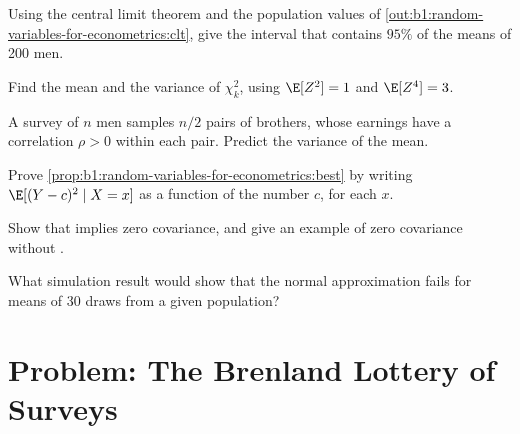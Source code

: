 \begin{exercise}[$\star\star$]\label{exo:b1:random-variables-for-econometrics:interval}
Using the central limit theorem and the population values of
\cref{out:b1:random-variables-for-econometrics:clt}, give the interval that contains $95\%$ of
the means of 200 men.
\end{exercise}

\begin{exercise}[$\star\star$]\label{exo:b1:random-variables-for-econometrics:chi2}
Find the mean and the variance of $\chi^2_k$, using $\E[Z^2] = 1$ and $\E[Z^4] = 3$.
\end{exercise}

\begin{exercise}[$\star\star$]\label{exo:b1:random-variables-for-econometrics:brothers}
A survey of $n$ men samples $n/2$ pairs of brothers, whose earnings have a
correlation $\rho > 0$ within each pair. Predict the variance of the mean.
\end{exercise}

\begin{exercise}[$\star\star\star$]\label{exo:b1:random-variables-for-econometrics:best}
Prove \cref{prop:b1:random-variables-for-econometrics:best} by writing $\E[(Y - c)^2 \mid X = x]$ as a
function of the number $c$, for each $x$.
\end{exercise}

\begin{exercise}[$\star\star\star$]\label{exo:b1:random-variables-for-econometrics:mean-indep}
Show that  implies zero covariance, and give an example
of zero covariance without .
\end{exercise}

\begin{exercise}[$\star\star\star$]\label{exo:b1:random-variables-for-econometrics:fail}
What simulation result would show that the normal approximation fails for
means of 30 draws from a given population?
\end{exercise}

\section{Problem: The Brenland Lottery of Surveys}\label{sec:b1:random-variables-for-econometrics:problem}

